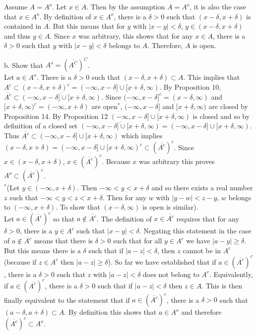 \documentclass[a4paper]{article}
\begin{document}
Assume $A = A^o$. Let $x \in A$. Then by the assumption $A = A^o$, it is also the case that $x \in A^o$. By definition of $x \in A^o$, there is a $\delta > 0$ such that $(x-\delta, x+\delta)$ is contained in $A$. But this means that for $y$ with $|x-y|<\delta$, $y \in (x-\delta,x+\delta)$ and thus $y \in A$. Since $x$ was arbitrary, this shows that for any $x \in A$, there is a $\delta > 0$ such that $y$ with $|x-y|<\delta$ belongs to $A$. Therefore, $A$ is open. 

b. Show that $A^o = \left(\overline{A^C}\right)^C$.\\

Let $a \in A^o$. There is a $\delta > 0 $ such that $(x-\delta,x+\delta) \subset A$. This implies that $A^c \subset (x-\delta,x+\delta)^c = (-\infty,x-\delta]\cup[x+\delta,\infty)$. By Proposition 10, $\overline{A^c} \subset \overline{(-\infty,x-\delta]\cup[x+\delta,\infty)}$. Since $(-\infty,x-\delta]^c = (x-\delta, \infty)$ and $[x+\delta,\infty)^c = (-\infty,x+\delta)$ are open$^*$, $(-\infty,x-\delta]$ and $[x+\delta,\infty)$ are closed by Proposition 14. By Proposition 12 $(-\infty,x-\delta]\cup[x+\delta,\infty)$ is closed and so by definition of a closed set $\overline{(-\infty,x-\delta]\cup[x+\delta,\infty)} = (-\infty,x-\delta]\cup[x+\delta,\infty)$. Thus $\overline{A^c} \subset (-\infty,x-\delta]\cup[x+\delta,\infty)$ which implies $(x-\delta,x+\delta)=(-\infty,x-\delta]\cup[x+\delta,\infty)^c \subset \left(\overline{A^c}\right)^c$. Since $x \in (x-\delta,x+\delta)$, $x \in \left(\overline{A^c}\right)^c$. Because $x$ was arbitrary this proves $A^o \subset \left(\overline{A^c}\right)^c$. \\

$^*$(Let $y \in (-\infty, x+ \delta)$. Then $-\infty < y<x+\delta$ and so there exists a real number $z$ such that $-\infty <y<z<x+\delta$. Then for any $w$ with $|y-w|<z-y$, $w$ belongs to $(-\infty,x+\delta)$. To show that $(x-\delta, \infty)$ is open is similar). \\

Let $a \in \left(\overline{A^c}\right)^c$ so that $a \not\in \overline{A^c}$. The definition of $x \in \overline{A^c}$ requires that for any $\delta>0$, there is a $y \in A^c$ such that $|x-y|<\delta$. Negating this statement in the case of $a \not\in \overline{A^c}$ means that there is $\delta > 0$ such that for all $y \in A^c$ we have $|a-y| \geq \delta$. But this means there is a $\delta$ such that if $|a-z|<\delta$, then $z$ cannot be in $A^c$ (because if $z \in A^c$ then $|a-z|\geq \delta$). So far we have established that if $a \in  \left(\overline{A^c}\right)^c$, there is a $\delta>0$ such that $z$ with $|a-z| < \delta$ does not belong to $A^c$. Equivalently, if $a \in  \left(\overline{A^c}\right)^c$, there is a $\delta>0$ such that if $|a-z| < \delta$ then $z \in A$. This is then finally equivalent to the statement that if $a \in  \left(\overline{A^c}\right)^c$, there is a $\delta>0$ such that $(a-\delta,a+\delta) \subset A$. By definition this shows that $a \in A^o$ and therefore $\left(\overline{A^c}\right)^c\subset A^o$. \\
\end{document}
